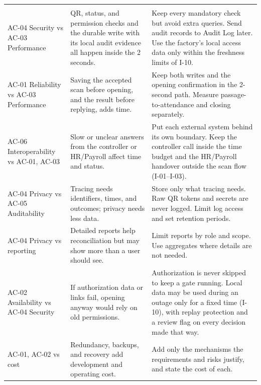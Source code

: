 {\renewcommand{\arraystretch}{1.2}
\begin{longtable}{|>{\raggedright\arraybackslash}p{93.5pt}|>{\raggedright\arraybackslash}p{138.5pt}|>{\raggedright\arraybackslash}p{177.5pt}|}
\hline
\multicolumn{1}{|>{\columncolor{tableheader}\centering\arraybackslash}p{93.5pt}|}{\textbf{Trade-off}} & \multicolumn{1}{>{\columncolor{tableheader}\centering\arraybackslash}p{138.5pt}|}{\textbf{Cause}} & \multicolumn{1}{>{\columncolor{tableheader}\centering\arraybackslash}p{177.5pt}|}{\textbf{Approach}} \\
\hline
\endhead
\multicolumn{3}{c}{\rule{0pt}{20pt}\normalsize\textbf{Table 2.4. Main Architectural Trade-offs}} \\
\endlastfoot
AC-04 Security vs AC-03 Performance & QR, status, and permission checks and the durable write with its local audit evidence all happen inside the 2 seconds. & Keep every mandatory check but avoid extra queries. Send audit records to Audit Log later. Use the factory's local access data only within the freshness limits of I-10. \\
\hline
AC-01 Reliability vs AC-03 Performance & Saving the accepted scan before opening, and the result before replying, adds time. & Keep both writes and the opening confirmation in the 2-second path. Measure passage-to-attendance and closing separately. \\
\hline
AC-06 Interoperability vs AC-01, AC-03 & Slow or unclear answers from the controller or HR/Payroll affect time and status. & Put each external system behind its own boundary. Keep the controller call inside the time budget and the HR/Payroll handover outside the scan flow (I-01--I-03). \\
\hline
AC-04 Privacy vs AC-05 Auditability & Tracing needs identifiers, times, and outcomes; privacy needs less data. & Store only what tracing needs. Raw QR tokens and secrets are never logged. Limit log access and set retention periods. \\
\hline
AC-04 Privacy vs reporting & Detailed reports help reconciliation but may show more than a user should see. & Limit reports by role and scope. Use aggregates where details are not needed. \\
\hline
AC-02 Availability vs AC-04 Security & If authorization data or links fail, opening anyway would rely on old permissions. & Authorization is never skipped to keep a gate running. Local data may be used during an outage only for a fixed time (I-10), with replay protection and a review flag on every decision made that way. \\*
\hline\noalign{\nobreak}
AC-01, AC-02 vs cost & Redundancy, backups, and recovery add development and operating cost. & Add only the mechanisms the requirements and risks justify, and state the cost of each. \\
\hline
\end{longtable}
}
